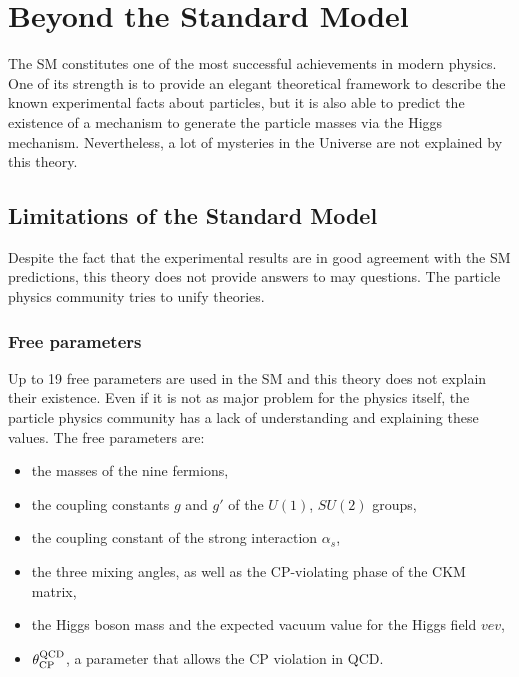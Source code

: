 
  \section{Beyond the Standard Model}

  The \gls{SM} constitutes one of the most successful achievements in modern physics.
  One of its strength is to provide an elegant theoretical framework to describe the known experimental facts about particles, but it is also able to predict the existence of a mechanism to generate the particle masses via the Higgs mechanism.
  Nevertheless, a lot of mysteries in the Universe are not explained by this theory. 
  
    \subsection{Limitations of the Standard Model}

    Despite the fact that the experimental results are in good agreement with the \gls{SM} predictions, this theory does not provide answers to may questions.
    The particle physics community tries to unify theories.

      \subsubsection{Free parameters}

      Up to 19 free parameters are used in the \gls{SM} and this theory does not explain their existence.
      Even if it is not as major problem for the physics itself, the particle physics community has a lack of understanding and explaining these values.
      The free parameters are: 
      \begin{itemize}
        \item the masses of the nine fermions,
        \item the coupling constants $g$ and $g'$ of the $U(1)$, $SU(2)$ groups,
        \item the coupling constant of the strong interaction $\alpha_s$,
        \item the three mixing angles, as well as the CP-violating phase of the CKM matrix,
        \item the Higgs boson mass and the expected vacuum value for the Higgs field $vev$,
        \item $\theta^{\rm{QCD}}_{\rm{CP}}$, a parameter that allows the CP violation in \gls{QCD}.
      \end{itemize}

